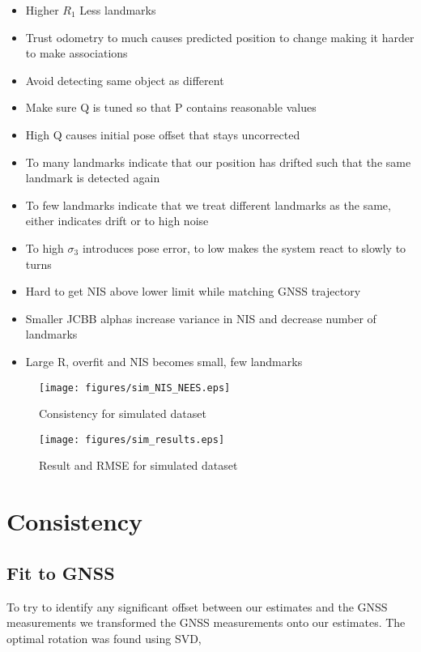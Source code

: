\begin{itemize}
    \item Higher $R_1$ Less landmarks
    \item Trust odometry to much causes predicted position to change making it harder to make associations
    \item Avoid detecting same object as different
    \item Make sure Q is tuned so that P contains reasonable values
    \item High Q causes initial pose offset that stays uncorrected
    \item To many landmarks indicate that our position has drifted such that the same landmark is detected again
    \item To few landmarks indicate that we treat different landmarks as the same, either indicates drift or to high noise
    \item To high $\sigma_3$ introduces pose error, to low makes the system react to slowly to turns
    \item Hard to get NIS above lower limit while matching GNSS trajectory
    \item Smaller JCBB alphas increase variance in NIS and decrease number of landmarks
    \item Large R, overfit and NIS becomes small, few landmarks
\end{itemize}



\begin{figure}
    \centering
    \texttt{[image: figures/sim\_NIS\_NEES.eps]}
    \caption{Consistency for simulated dataset}
	\label{fig:1_1}
\end{figure}
\begin{figure}
    \centering
    \texttt{[image: figures/sim\_results.eps]}
    \caption{Result and RMSE for simulated dataset}
	\label{fig:1_2}
\end{figure}


\section{Consistency}

\subsection{Fit to GNSS}


To try to identify any significant offset between our estimates
and the GNSS measurements we transformed the GNSS measurements onto our estimates.
The optimal rotation was found using SVD,

